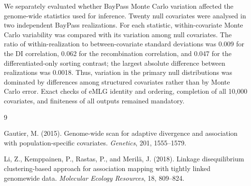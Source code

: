 \documentclass[11pt,a4paper]{article}
\begin{document}
We separately evaluated whether BayPass Monte Carlo variation affected the genome-wide statistics used for inference. Twenty null covariates were analysed in two independent BayPass realizations. For each statistic, within-covariate Monte Carlo variability was compared with its variation among null covariates. The ratio of within-realization to between-covariate standard deviations was 0.009 for the DI correlation, 0.062 for the recombination correlation, and 0.047 for the differentiated-only sorting contrast; the largest absolute difference between realizations was 0.0018. Thus, variation in the primary null distributions was dominated by differences among structured covariates rather than by Monte Carlo error. Exact checks of eMLG identity and ordering, completion of all 10,000 covariates, and finiteness of all outputs remained mandatory.

\begin{thebibliography}{9}

Gautier, M. (2015).
Genome-wide scan for adaptive divergence and association with population-specific covariates.
\textit{Genetics}, 201, 1555--1579.

Li, Z., Kemppainen, P., Rastas, P., and Meril\"a, J. (2018).
Linkage disequilibrium clustering-based approach for association mapping with tightly linked genomewide data.
\textit{Molecular Ecology Resources}, 18, 809--824.

\end{thebibliography}
\end{document}
